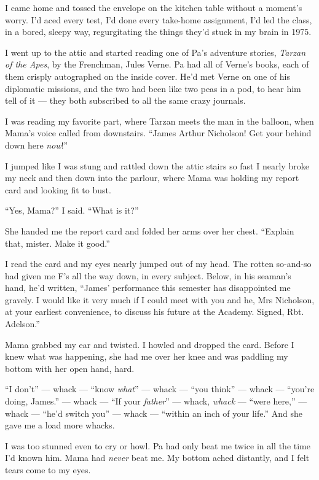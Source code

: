 I came home and tossed the envelope on the kitchen table without a
moment's worry. I'd aced every test, I'd done every take-home
assignment, I'd led the class, in a bored, sleepy way,
regurgitating the things they'd stuck in my brain in 1975.

I went up to the attic and started reading one of Pa's adventure
stories, \emph{Tarzan of the Apes}, by the Frenchman, Jules Verne.
Pa had all of Verne's books, each of them crisply autographed on
the inside cover. He'd met Verne on one of his diplomatic missions,
and the two had been like two peas in a pod, to hear him tell of it
--- they both subscribed to all the same crazy journals.

I was reading my favorite part, where Tarzan meets the man in the
balloon, when Mama's voice called from downstairs.
``James Arthur Nicholson! Get your behind down here \emph{now}!''

I jumped like I was stung and rattled down the attic stairs so fast
I nearly broke my neck and then down into the parlour, where Mama
was holding my report card and looking fit to bust.

``Yes, Mama?'' I said. ``What is it?''

She handed me the report card and folded her arms over her chest.
``Explain that, mister. Make it good.''

I read the card and my eyes nearly jumped out of my head. The
rotten so-and-so had given me F's all the way down, in every
subject. Below, in his seaman's hand, he'd written,
``James' performance this semester has disappointed me gravely. I would like it 
very much if I could meet with you and he, Mrs Nicholson, at your earliest 
convenience, to discuss his future at the Academy. Signed, Rbt. Adelson.''

Mama grabbed my ear and twisted. I howled and dropped the card.
Before I knew what was happening, she had me over her knee and was
paddling my bottom with her open hand, hard.

``I don't'' --- whack --- ``know \emph{what}'' --- whack ---
``you think'' --- whack --- ``you're doing, James.'' --- whack ---
``If your \emph{father}'' --- whack, \emph{whack} ---
``were here,'' --- whack --- ``he'd switch you'' --- whack ---
``within an inch of your life.'' And she gave me a load more
whacks.

I was too stunned even to cry or howl. Pa had only beat me twice in
all the time I'd known him. Mama had \emph{never} beat me. My
bottom ached distantly, and I felt tears come to my eyes.

